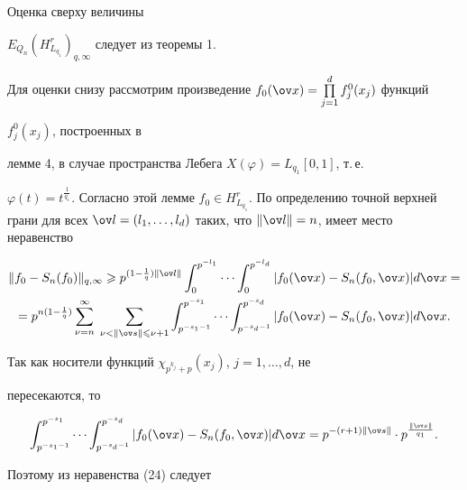 \begin{pf}


Оценка сверху величины


$E_{Q_{n}}(H_{L_{q_{1}}}^{r})_{q,\infty}$ следует из теоремы 1.





Для оценки снизу рассмотрим произведение $f_{0}(\ov x)= 


\prod\limits_{j=1}^{d}f_{j}^{0}(x_{j})$ функций


$f^0_{j}(x_{j})$, построенных в 


лемме 4, в случае пространства Лебега $X(\varphi)=L_{q_{1}}[0,1]$, т.\,е. 


$\varphi(t)=t^{\frac{1}{q_{1}}}$. Согласно этой лемме $f_{0}\in 


H_{L_{q_{1}}}^{r}$. По определению точной верхней грани для всех $\ov 


l=(l_{1},\dotsc,l_{d})$ таких, что $\|\ov l\|=n$, имеет место неравенство


\begin{multline}


\|f_{0}-S_{n}(f_{0})\|_{q,\infty}\geq p^{(1-\frac{1}{q})\|\ov l\|} 


\int_{0}^{p^{-l_{1}}}\cdots\int_{0}^{p^{-l_{d}}}|f_{0}(\ov 


x)-S_{n}(f_{0},\ov x)|d\ov x= \\


%


=p^{n(1-\frac{1}{q})} \sum_{\nu=n}^{\infty}\;\sum_{\nu<\|\ov s\|\leq\nu+1}


\int_{p^{-s_{1}-1}}^{p^{-s_{1}}}\cdots\int_{p^{-s_{d}-1}}^{p^{-s_{d}}}|f_{0} 


(\ov x)-S_{n}(f_{0},\ov x)|d\ov x.


\end{multline}


Так как носители функций $\chi_{p^{k_{j}}+p}(x_{j})$, $j=1,\dotsc,d$, не 


пересекаются, то 


$$


\int_{p^{-s_{1}-1}}^{p^{-s_{1}}}\dotsb\int_{p^{-s_{d}-1}}^{p^{-s_{d}}}|f_{0} 


(\ov x)-S_{n}(f_{0},\ov x)|d\ov x=p^{-(r+1)\|\ov 


s\|}\cdot p^{\frac{\|\ov s\|}{q_{1}}}.


$$


Поэтому из неравенства (24) следует


\begin{equation}



\end{equation}
\end{pf}
